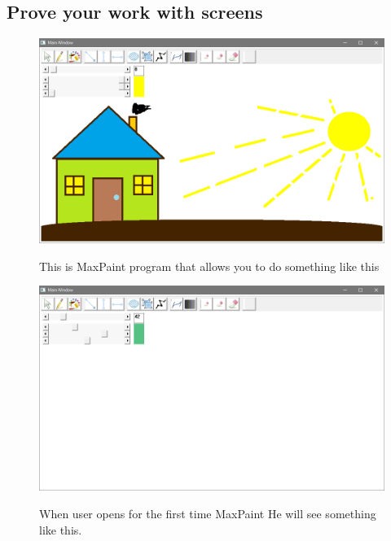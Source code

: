 \clearpage
\subsection{Prove your work with screens}



\begin{figure}[h!]
  \centering
    {%
      \includegraphics[width=1\textwidth]{3}}
  \caption{This is MaxPaint program that allows you to do something like this}
\end{figure}

\begin{figure}[h!]
  \centering
    {%
      \includegraphics[width=1\textwidth]{1}}
  \caption{When user opens for the first time MaxPaint He will see something like this.}
\end{figure}

